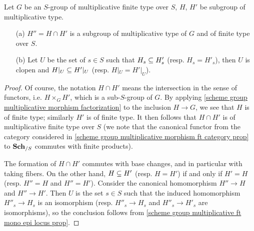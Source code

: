 \begin{corollary}\label{scheme group multiplicative subgroup inclusion locus prop}
Let $G$ be an $S$-group of multiplicative finite type over $S$, $H$, $H'$ be subgroup of multiplicative type.
\begin{enumerate}
    \item[(a)] $H''=H\cap H'$ is a subgroup of multiplicative type of $G$ and of finite type over $S$.
    \item[(b)] Let $U$ be the set of $s\in S$ such that $H_s\subseteq H'_s$ (resp. $H_s=H'_s$), then $U$ is clopen and $H|_U\subseteq H'|_U$ (resp. $H|_U=H'|_U$). 
\end{enumerate}
\end{corollary}
\begin{proof}
Of course, the notation $H\cap H'$ means the intersection in the sense of functors, i.e. $H\times_GH'$, which is a sub-$S$-group of $G$. By applying \cref{scheme group multiplicative morphism factorization} to the inclusion $H\to G$, we see that $H$ is of finite type; similarly $H'$ is of finite type. It then follows that $H\cap H'$ is of multiplicative finite type over $S$ (we note that the canonical functor from the category considered in \cref{scheme group multiplicative morphism ft category prop} to $\mathbf{Sch}_{/S}$ commutes with finite products).\par
The formation of $H\cap H'$ commutes with base changes, and in particular with taking fibers. On the other hand, $H\subseteq H'$ (resp. $H=H'$) if and only if $H'=H$ (resp. $H''=H$ and $H''=H'$). Consider the canonical homomorphism $H''\to H$ and $H''\to H'$. Then $U$ is the set $s\in S$ such that the induced homomorphism $H''_s\to H_s$ is an isomorphism (resp. $H''_s\to H_s$ and $H''_s\to H'_s$ are isomorphisms), so the conclusion follows from \cref{scheme group multiplicative ft mono epi locus prop}.
\end{proof}

